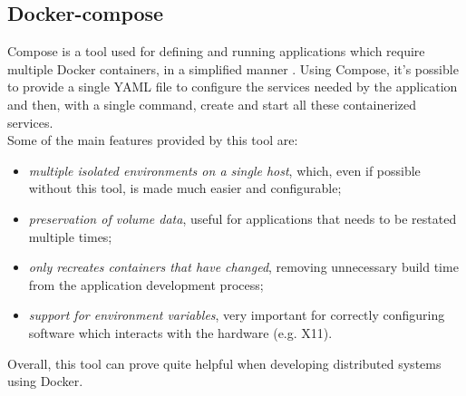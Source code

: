 \subsection{Docker-compose}\label{docker-compose}
Compose is a tool used for defining and running applications which require multiple Docker containers, in a simplified manner \cite{site:docker-compose-doc}. Using Compose, it's possible to provide a single YAML file to configure the services needed by the application and then, with a single command, create and start all these containerized services. \\
Some of the main features provided by this tool are:
\begin{itemize}
	\item \textit{multiple isolated environments on a single host}, which, even if possible without this tool, is made much easier and configurable;
	\item \textit{preservation of volume data}, useful for applications that needs to be restated multiple times;
	\item \textit{only recreates containers that have changed}, removing unnecessary build time from the application development process;
	\item \textit{support for environment variables}, very important for correctly configuring software which interacts with the hardware (e.g. X11).
\end{itemize}
Overall, this tool can prove quite helpful when developing distributed systems using Docker.

